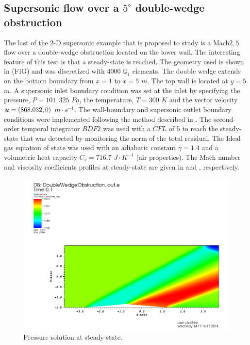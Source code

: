 \subsection{Supersonic flow over a $5^\circ$ double-wedge obstruction} \label{sec:double_wedge}
The last of the $2$-D supersonic example that is proposed to study is a Mach$2,5$ flow over a double-wedge obstruction located on the lower wall. The interesting feature of this test is that a steady-state is reached. The geometry used is shown in (FIG) and was discretized with $4000$ $\mathbb Q_1$ elements. The double wedge extends on the bottom boundary from $x=1$ to $x=5$  $m$. The top wall is located at $y=5$ $m$. A supersonic inlet boundary condition was set at the inlet by specifying the pressure, $P=101,325$ $Pa$, the temperature, $T=300$ $K$ and the vector velocity $\boldsymbol u = (868.032, 0)$ $m \cdot s^{-1}$. The wall-boundary and supersonic outlet boundary conditions were implemented following the method described in . The second-order temporal integrator $BDF2$ was used with a $CFL$ of 5 to reach the steady-state that was detected by monitoring the norm of the total residual. The Ideal gas equation of state was used with an adiabatic constant $\gamma = 1.4$ and a volumetric heat capacity $C_v = 716.7$ $J \cdot K^{-1}$ (air properties). The Mach number and viscosity coefficients profiles at steady-state are given in  and , respectively. 
        \begin{figure}[H]%
                \centering
                \includegraphics[scale=.50]{figures/DWOMachNumberStt.png}
                \caption{Pressure solution at steady-state.}
                \label{fig:2d_dbwd_stt}
        \end{figure}%
